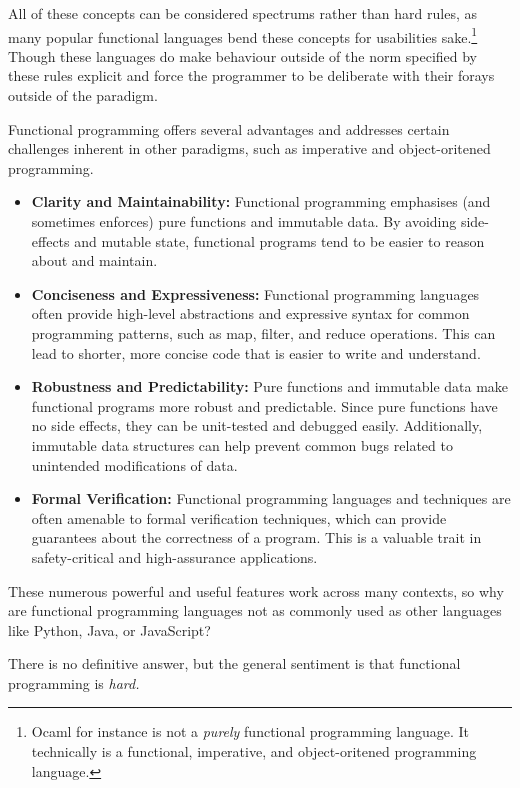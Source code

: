 \documentclass{l4proj}
\begin{document}
All of these concepts can be considered spectrums rather than hard rules, as many popular functional languages bend these concepts for usabilities sake.\footnote{Ocaml for instance is not a \emph{purely} functional programming language. It technically is a functional, imperative, and object-oritened programming language.}
Though these languages do make behaviour outside of the norm specified by these rules explicit and force the programmer to be deliberate with their forays outside of the paradigm.

Functional programming offers several advantages and addresses certain challenges inherent in other paradigms, such as imperative and object-oritened programming. 

\begin{itemize}
    \item \textbf{Clarity and Maintainability:} Functional programming emphasises (and sometimes enforces) pure functions and immutable data.
    By avoiding side-effects and mutable state, functional programs tend to be easier to reason about and maintain.
    \item \textbf{Conciseness and Expressiveness:} Functional programming languages often provide high-level abstractions and expressive syntax for common programming patterns, such as map, filter, and reduce operations.
    This can lead to shorter, more concise code that is easier to write and understand.
    \item \textbf{Robustness and Predictability:} Pure functions and immutable data make functional programs more robust and predictable.
    Since pure functions have no side effects, they can be unit-tested and debugged easily.
    Additionally, immutable data structures can help prevent common bugs related to unintended modifications of data.
    \item \textbf{Formal Verification:} Functional programming languages and techniques are often amenable to formal verification techniques, which can provide guarantees about the correctness of a program.
    This is a valuable trait in safety-critical and high-assurance applications.
\end{itemize}

These numerous powerful and useful features work across many contexts, so why are functional programming languages not as commonly used as other languages like Python, Java, or JavaScript?

There is no definitive answer, but the general sentiment is that functional programming is \emph{hard.}
\end{document}

